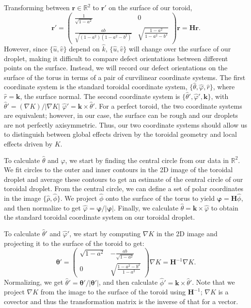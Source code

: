 Transforming between $\mathbf{r} \in \mathbb{R}^2$ to $\mathbf{r}'$ on the surface of our toroid,
\begin{equation}
  \mathbf{r}' =
  \begin{pmatrix}
  \frac{1}{\sqrt{1-a^2}} & 0 \\
  \frac{ab}{\sqrt{(1-a^2)(1-a^2-b^2)}} & \sqrt{\frac{1-a^2}{1-a^2-b^2}}
  \end{pmatrix}
  \mathbf{r} = \bm{H}\mathbf{r}.
\end{equation}
However, since $\{ \hat{u},\hat{v}\}$ depend on $\hat{k}$, $\{ \hat{u},\hat{v}\}$ will change over the surface of our droplet, making it difficult to compare defect orientations between different points on the surface.
Instead, we will record our defect orientations on the surface of the torus in terms of a pair of curvilinear coordinate systems.
The first coordinate system is the standard toroidal coordinate system, $\{\hat{\theta}, \hat{\varphi}, \hat{r}  \}$, where $\hat{r} = \mathbf{k}$, the surface normal.
The second coordinate system is $\{\hat{\theta}', \hat{\varphi}',\mathbf{k} \}$, with $\hat{\theta}' = (\nabla K)/|\nabla K|$ $\hat{\varphi}' = \mathbf{k} \times \hat{\theta}'$.
For a perfect toroid, the two coordinate systems are equivalent; however, in our case, the surface can be rough and our droplets are not perfectly axisymmetric.
Thus, our two coordinate systems should allow us to distinguish between global effects driven by the toroidal geometry and local effects driven by $K$.

To calculate $\hat{\theta}$ and $\hat{\varphi}$, we start by finding the central circle from our data in $\mathbb{R}^2$.
We fit circles to the outer and inner contours in the 2D image of the toroidal droplet and average these contours to get an estimate of the central circle of our toroidal droplet.
From the central circle, we can define a set of polar coordinates in the image $\{\hat{\rho}, \hat{\phi}\}$.
We project $\hat{\phi}$ onto the surface of the torus to yield $\bm{\varphi} = \bm{H}\hat{\phi}$, and then normalize to get $\hat{\varphi} = \bm{\varphi}/|\bm{\varphi}|$.
Finally, we calculate $\hat{\theta} = \mathbf{k} \times \hat{\varphi}$ to obtain the standard toroidal coordinate system on our toroidal droplet.

To calculate $\hat{\theta}'$ and $\hat{\varphi}'$, we start by computing $\nabla K$ in the 2D image and projecting it to the surface of the toroid to get:
\begin{equation}
  \bm{\theta}' =
  \begin{pmatrix}
    \sqrt{1-a^2} & -\frac{ab}{\sqrt{1-a^2}} \\
    0 & \sqrt{\frac{1-a^2-b^2}{1-a^2}}
  \end{pmatrix}
  \nabla K = \bm{H}^{-1} \nabla K.
\end{equation}
Normalizing, we get $\hat{\theta}' = \bm{\theta}'/|\bm{\theta}'|$, and then calculate $\hat{\phi}' = \mathbf{k} \times \hat{\theta}'$.
Note that we project $\nabla K$ from the image to the surface of the toroid using $\bm{H}^{-1}$; $\nabla K$ is a covector and thus the transformation matrix is the inverse of that for a vector.

